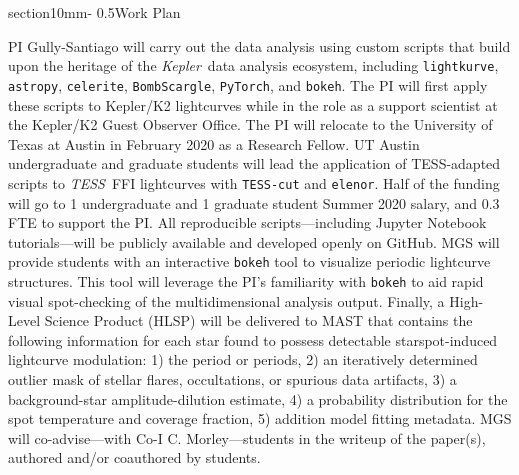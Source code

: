 \documentclass[letterpaper,11pt]{article}
\makeatletter
\renewcommand{\section}{\@startsection%
{section}{1}{0mm}{-\baselineskip}%
{0.5\baselineskip}{\normalfont\Large\bfseries}}%
\newcommand{\tess}{{\it TESS}}
\newcommand{\kepler}{{\it Kepler}}
\makeatother
\begin{document}
\section{Work Plan}

PI Gully-Santiago will carry out the data analysis using custom scripts that build upon the heritage of the \kepler\ data analysis ecosystem, including \texttt{lightkurve}, \texttt{astropy}, \texttt{celerite}, \texttt{BombScargle}, \texttt{PyTorch}, and \texttt{bokeh}.  The PI will first apply these scripts to Kepler/K2 lightcurves while in the role as a support scientist at the Kepler/K2 Guest Observer Office.  The PI will relocate to the University of Texas at Austin in February 2020 as a Research Fellow.  UT Austin undergraduate and graduate students will lead the application of TESS-adapted scripts to \tess\ FFI lightcurves with \texttt{TESS-cut} and \texttt{elenor}.  Half of the funding will go to 1 undergraduate and 1 graduate student Summer 2020 salary, and 0.3 FTE to support the PI.  All reproducible scripts---including Jupyter Notebook tutorials---will be publicly available and developed openly on GitHub.  MGS will provide students with an interactive \texttt{bokeh} tool to visualize periodic lightcurve structures.  This tool will leverage the PI's familiarity with \texttt{bokeh} to aid rapid visual spot-checking of the multidimensional analysis output.  Finally, a High-Level Science Product (HLSP) will be delivered to MAST that contains the following information for each star found to possess detectable starspot-induced lightcurve modulation: 1) the period or periods, 2) an iteratively determined outlier mask of stellar flares, occultations, or spurious data artifacts, 3) a background-star amplitude-dilution estimate, 4) a probability distribution for the spot temperature and coverage fraction, 5) addition model fitting metadata.  MGS will co-advise---with Co-I C. Morley---students in the writeup of the paper(s), authored and/or coauthored by students.

{\footnotesize

}
\end{document}

